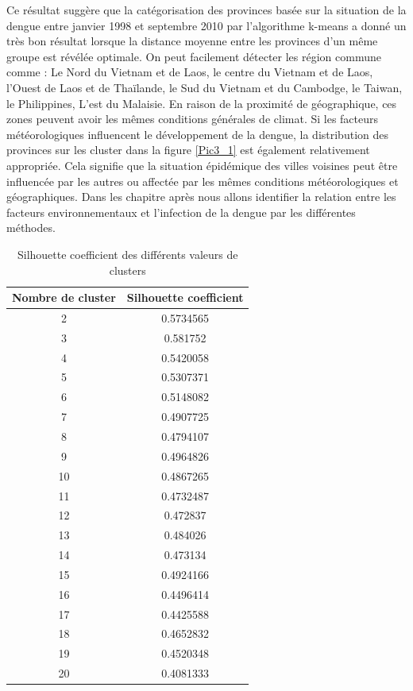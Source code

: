 Ce résultat suggère que la catégorisation des provinces  basée sur la situation de la dengue entre janvier 1998 et septembre 2010 par l'algorithme k-means a donné un très bon résultat lorsque la distance moyenne entre les provinces d'un même groupe est révélée optimale. On peut facilement détecter les région commune comme : Le Nord du Vietnam et de Laos, le centre du Vietnam et de Laos, l'Ouest de Laos et de Thaïlande, le Sud du Vietnam et du Cambodge, le Taiwan, le Philippines, L'est du Malaisie. En raison de la proximité de géographique, ces zones peuvent avoir les mêmes conditions générales de climat. Si les facteurs météorologiques influencent le développement de la dengue, la  distribution des provinces sur les cluster dans la figure \ref{Pic3_1} est également relativement appropriée. Cela signifie que la situation épidémique des villes voisines peut être influencée par les autres ou affectée par les mêmes conditions météorologiques et géographiques. Dans les chapitre après nous allons identifier la relation entre les facteurs environnementaux et l'infection de la dengue par les différentes méthodes.
\begin{table}[h]
\centering
\begin{tabular} { | c | c |}
\hline
Nombre de cluster & Silhouette coefficient \\
\hline
2 & 0.5734565 \\
\hline
3 & 0.581752 \\
\hline
4 & 0.5420058 \\
\hline
5 & 0.5307371 \\
\hline
6 & 0.5148082 \\
\hline
7 & 0.4907725 \\
\hline
8 & 0.4794107 \\
\hline
9 & 0.4964826 \\
\hline
10 & 0.4867265 \\
\hline
11 & 0.4732487 \\
\hline
12 & 0.472837 \\
\hline
13 & 0.484026 \\
\hline
14 & 0.473134 \\
\hline
15 & 0.4924166 \\
\hline
16 & 0.4496414 \\
\hline
17 & 0.4425588 \\
\hline
18 & 0.4652832 \\
\hline
19 & 0.4520348 \\
\hline
20 & 0.4081333 \\

\hline
\end{tabular}
\caption{Silhouette coefficient des différents valeurs de clusters} 
\label{table3.1}
\end{table}

